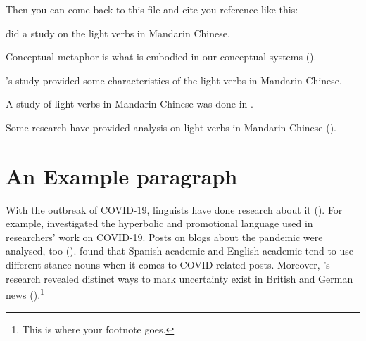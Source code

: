 Then you can come back to this file and cite you reference like this:\par

\textcite{lin2014light} %
did a study on the light verbs in Mandarin Chinese. \par
Conceptual metaphor is what is embodied in our conceptual systems (\cite{lakoff1980conceptual}). \par %
\citeauthor{lin2014light}'s study provided some characteristics of the light verbs in Mandarin Chinese. \par %
A study of light verbs in Mandarin Chinese was done in \citeyear{lin2014light}. \par %
Some research have provided analysis on light verbs in Mandarin Chinese (\cite[e.g.,][]{lin2014light}). %




\section{An Example paragraph}
With the outbreak of COVID-19, linguists have done research about it (\cite{mahlberg2021language,dong2021discourse,mcglashan2021networked}). For example, \textcite{hyland2021covid} investigated the hyperbolic and promotional language used in researchers' work on COVID-19. Posts on blogs about the pandemic were analysed, too (\cite{curry2021stance}). \textcite{curry2021stance} found that Spanish academic and English academic tend to use different stance nouns when it comes to COVID-related posts. Moreover, \citeauthor{muller2021communicating}'s research revealed distinct ways to mark uncertainty exist in British and German news (\citeyear{muller2021communicating}).\footnote{This is where your footnote goes.}
